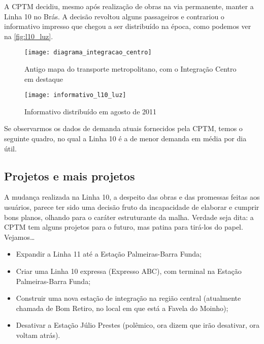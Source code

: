 \documentclass[11pt,fleqn]{book} %
\begin{document}
A CPTM decidiu, mesmo após realização de obras na via permanente, manter a Linha 10 no Brás. A decisão revoltou alguns passageiros e contrariou o informativo impresso que chegou a ser distribuído na época, como podemos ver na \autoref{fig:l10_luz}.

\begin{landscape}
	\begin{figure}[h]
		\centering
		\caption[Mapa do Integração Centro]{Antigo mapa do transporte metropolitano, com o Integração Centro em destaque}
		\texttt{[image: diagrama\_integracao\_centro]}
		\label{fig:diag_ic}
	\end{figure}
\end{landscape}

\begin{figure}[h!]
	\caption[Informativo agosto/2011]{Informativo distribuído em agosto de 2011}
	\centering
	\texttt{[image: informativo\_l10\_luz]}
	\label{fig:l10_luz}
\end{figure}

Se observarmos os dados de demanda atuais fornecidos pela CPTM, temos o seguinte quadro, no qual a Linha 10 é a de menor demanda em média por dia útil.


\subsection{Projetos e mais projetos}

A mudança realizada na Linha 10, a despeito das obras e das promessas feitas aos usuários, parece ter sido uma decisão fruto da incapacidade de elaborar e cumprir bons planos, olhando para o caráter estruturante da malha. Verdade seja dita: a CPTM tem alguns projetos para o futuro, mas patina para tirá-los do papel. Vejamos\dots

\begin{itemize}
	\item Expandir a Linha 11 até a Estação Palmeiras-Barra Funda;
	\item Criar uma Linha 10 expressa (Expresso ABC), com terminal na Estação Palmeiras-Barra Funda;
	\item Construir uma nova estação de integração na região central (atualmente chamada de Bom Retiro, no local em que está a Favela do Moinho);
	\item Desativar a Estação Júlio Prestes (polêmico, ora dizem que irão desativar, ora voltam atrás).
\end{itemize}
\end{document}
